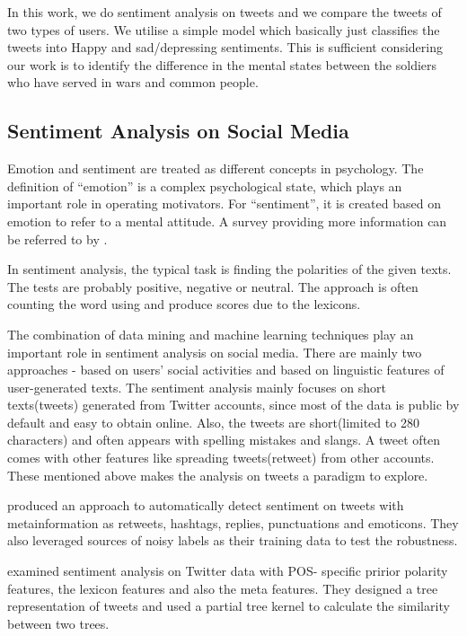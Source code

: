 In this work, we do sentiment analysis on tweets and we compare the tweets of
two types of users. We utilise a simple model which basically just classifies
the tweets into Happy and sad/depressing sentiments. This is sufficient
considering our work is to identify the difference in the mental states between
the soldiers who have served in wars and common people.

\subsection{Sentiment Analysis on Social Media}

Emotion and sentiment are treated as different concepts in psychology. The
definition of \enquote{emotion} is a complex psychological state, which plays an
important role in operating motivators. For \enquote{sentiment}, it is created based on
emotion to refer to a mental attitude. A survey providing more information can
be referred to by \cite{yue2018survey}.

In sentiment analysis, the typical task is finding the polarities of the given
texts. The tests are probably positive, negative or neutral. The approach is
often counting the word using and produce scores due to the lexicons.

The combination of data mining and machine learning techniques play an important
role in sentiment analysis on social media. There are mainly two approaches -
based on users' social activities and based on linguistic features of
user-generated texts. The sentiment analysis mainly focuses on short texts(tweets)
generated from Twitter accounts, since most of the data is public by default and
easy to obtain online. Also, the tweets are short(limited to 280 characters) and
often appears with spelling mistakes and slangs. A tweet often comes with other
features like spreading tweets(retweet) from other accounts. These mentioned
above makes the analysis on tweets a paradigm to explore.

\cite{robustTwitter2010Luciano} produced an approach to automatically detect
sentiment on tweets with metainformation as retweets, hashtags, replies,
punctuations and emoticons. They also leveraged sources of noisy
labels as their training data to test the robustness.

\cite{agarwal2011sentiment} examined sentiment analysis on Twitter data with POS-
specific pririor polarity features, the lexicon features and also the meta
features. They designed a tree representation of tweets and used a partial tree
kernel to calculate the similarity between two trees.

